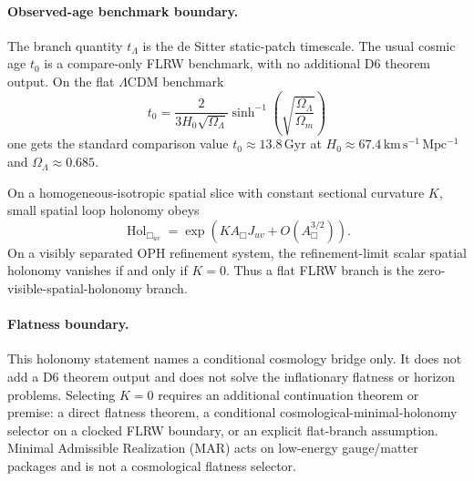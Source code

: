 \paragraph{Observed-age benchmark boundary.}
The branch quantity \(t_\Lambda\) is the de Sitter static-patch timescale. The usual cosmic age \(t_0\) is a compare-only FLRW benchmark, with no additional D6 theorem output. On the flat \(\Lambda\)CDM benchmark
\[
t_0=\frac{2}{3H_0\sqrt{\Omega_\Lambda}}
\sinh^{-1}\!\left(\sqrt{\frac{\Omega_\Lambda}{\Omega_m}}\right)
\]
one gets the standard comparison value \(t_0\approx 13.8\,\mathrm{Gyr}\) at
\(H_0\approx 67.4\,\mathrm{km\,s^{-1}\,Mpc^{-1}}\) and \(\Omega_\Lambda\approx 0.685\).

\begin{lemma}
On a homogeneous-isotropic spatial slice with constant sectional curvature \(K\), small spatial
loop holonomy obeys
\[
\operatorname{Hol}_{\Box_{uv}}=\exp\!\left(KA_\Box J_{uv}+O(A_\Box^{3/2})\right).
\]
On a visibly separated OPH refinement system, the refinement-limit scalar spatial holonomy vanishes
if and only if \(K=0\). Thus a flat FLRW branch is the zero-visible-spatial-holonomy branch.
\end{lemma}

\paragraph{Flatness boundary.}
This holonomy statement names a conditional cosmology bridge only. It does not add a D6 theorem
output and does not solve the inflationary flatness or horizon problems. Selecting \(K=0\) requires
an additional continuation theorem or premise: a direct flatness theorem, a conditional
cosmological-minimal-holonomy selector on a clocked FLRW boundary, or an explicit flat-branch
assumption. Minimal Admissible Realization (MAR) acts on low-energy gauge/matter packages and is not a cosmological flatness
selector.

